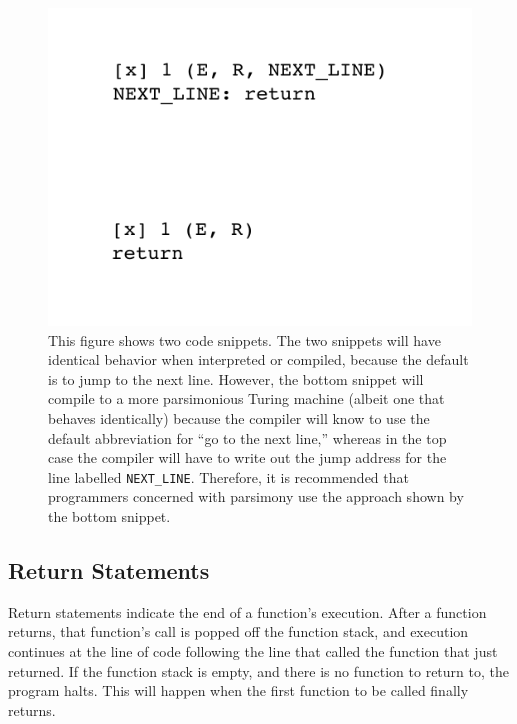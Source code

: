 \documentclass[11pt]{article}
\begin{document}
\begin{figure} 
\begin{center} 
\includegraphics[scale=0.4]{figs/defaultjump.png}
\caption{This figure shows two code snippets. The two snippets will have identical behavior when interpreted or compiled, because the default is to jump to the next line. However, the bottom snippet will compile to a more parsimonious Turing machine (albeit one that behaves identically) because the compiler will know to use the default abbreviation for ``go to the next line,'' whereas in the top case the compiler will have to write out the jump address for the line labelled \texttt{NEXT\_LINE}. Therefore, it is recommended that programmers concerned with parsimony use the approach shown by the bottom snippet. \label{fig:defaultjump}} 
\end{center} 
\end{figure}

\subsection{Return Statements}

Return statements indicate the end of a function's execution. After a function returns, that function's call is popped off the function stack, and execution continues at the line of code following the line that called the function that just returned. If the function stack is empty, and there is no function to return to, the program halts. This will happen when the first function to be called finally returns. \\
\end{document}
